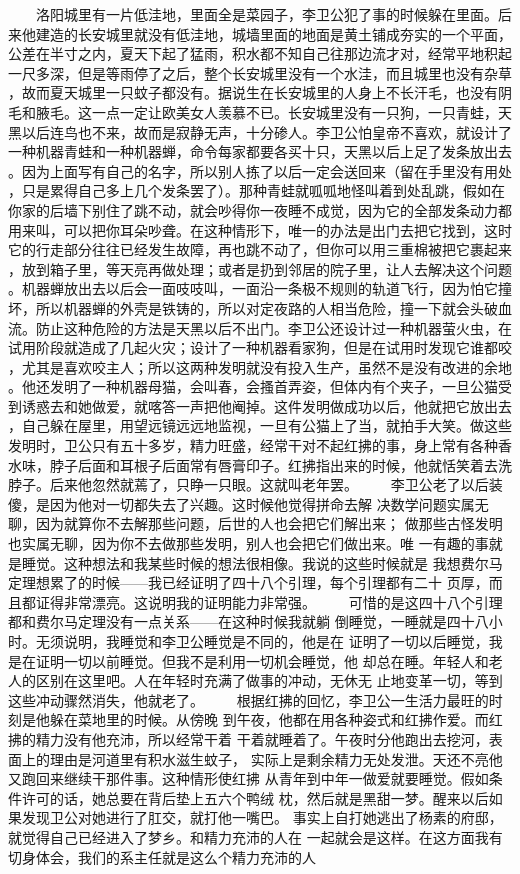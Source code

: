  　　洛阳城里有一片低洼地，里面全是菜园子，李卫公犯了事的时候躲在里面。后 来他建造的长安城里就没有低洼地，城墙里面的地面是黄土铺成夯实的一个平面， 公差在半寸之内，夏天下起了猛雨，积水都不知自己往那边流才对，经常平地积起 一尺多深，但是等雨停了之后，整个长安城里没有一个水洼，而且城里也没有杂草 ，故而夏天城里一只蚊子都没有。据说生在长安城里的人身上不长汗毛，也没有阴 毛和腋毛。这一点一定让欧美女人羡慕不已。长安城里没有一只狗，一只青蛙，天 黑以后连鸟也不来，故而是寂静无声，十分碜人。李卫公怕皇帝不喜欢，就设计了 一种机器青蛙和一种机器蝉，命令每家都要各买十只，天黑以后上足了发条放出去 。因为上面写有自己的名字，所以别人拣了以后一定会送回来（留在手里没有用处 ，只是累得自己多上几个发条罢了）。那种青蛙就呱呱地怪叫着到处乱跳，假如在 你家的后墙下别住了跳不动，就会吵得你一夜睡不成觉，因为它的全部发条动力都 用来叫，可以把你耳朵吵聋。在这种情形下，唯一的办法是出门去把它找到，这时 它的行走部分往往已经发生故障，再也跳不动了，但你可以用三重棉被把它裹起来 ，放到箱子里，等天亮再做处理；或者是扔到邻居的院子里，让人去解决这个问题 。机器蝉放出去以后会一面吱吱叫，一面沿一条极不规则的轨道飞行，因为怕它撞 坏，所以机器蝉的外壳是铁铸的，所以对定夜路的人相当危险，撞一下就会头破血 流。防止这种危险的方法是天黑以后不出门。李卫公还设计过一种机器萤火虫，在 试用阶段就造成了几起火灾；设计了一种机器看家狗，但是在试用时发现它谁都咬 ，尤其是喜欢咬主人；所以这两种发明就没有投入生产，虽然不是没有改进的余地 。他还发明了一种机器母猫，会叫春，会搔首弄姿，但体内有个夹子，一旦公猫受 到诱惑去和她做爱，就喀答一声把他阉掉。这件发明做成功以后，他就把它放出去 ，自己躲在屋里，用望远镜远远地监视，一旦有公猫上了当，就拍手大笑。做这些 发明时，卫公只有五十多岁，精力旺盛，经常干对不起红拂的事，身上常有各种香 水味，脖子后面和耳根子后面常有唇膏印子。红拂指出来的时候，他就恬笑着去洗 脖子。后来他忽然就蔫了，只睁一只眼。这就叫老年罢。 　　李卫公老了以后装傻，是因为他对一切都失去了兴趣。这时候他觉得拼命去解 决数学问题实属无聊，因为就算你不去解那些问题，后世的人也会把它们解出来； 做那些古怪发明也实属无聊，因为你不去做那些发明，别人也会把它们做出来。唯 一有趣的事就是睡觉。这种想法和我某些时候的想法很相像。我说的这些时候就是 我想费尔马定理想累了的时候——我已经证明了四十八个引理，每个引理都有二十 页厚，而且都证得非常漂亮。这说明我的证明能力非常强。 　　可惜的是这四十八个引理都和费尔马定理没有一点关系——在这种时候我就躺 倒睡觉，一睡就是四十八小时。无须说明，我睡觉和李卫公睡觉是不同的，他是在 证明了一切以后睡觉，我是在证明一切以前睡觉。但我不是利用一切机会睡觉，他 却总在睡。年轻人和老人的区别在这里吧。人在年轻时充满了做事的冲动，无休无 止地变革一切，等到这些冲动骤然消失，他就老了。 　　根据红拂的回忆，李卫公一生活力最旺的时刻是他躲在菜地里的时候。从傍晚 到午夜，他都在用各种姿式和红拂作爱。而红拂的精力没有他充沛，所以经常干着 干着就睡着了。午夜时分他跑出去挖河，表面上的理由是河道里有积水滋生蚊子， 实际上是剩余精力无处发泄。天还不亮他又跑回来继续干那件事。这种情形使红拂 从青年到中年一做爱就要睡觉。假如条件许可的话，她总要在背后垫上五六个鸭绒 枕，然后就是黑甜一梦。醒来以后如果发现卫公对她进行了肛交，就打他一嘴巴。 事实上自打她逃出了杨素的府邸，就觉得自己已经进入了梦乡。和精力充沛的人在 一起就会是这样。在这方面我有切身体会，我们的系主任就是这么个精力充沛的人 